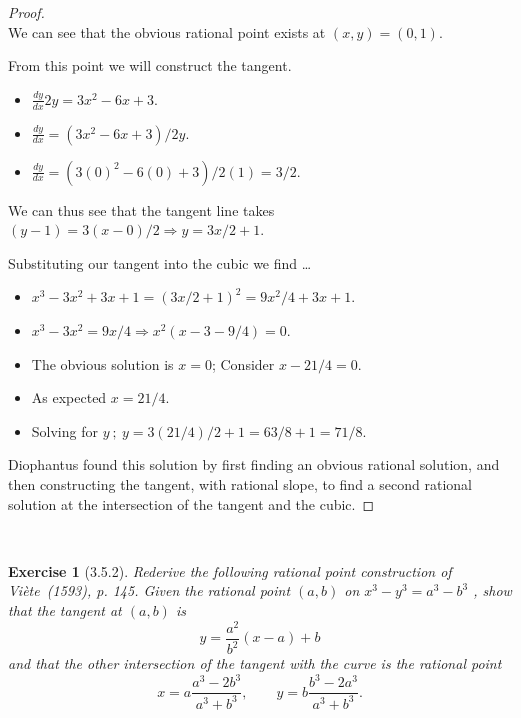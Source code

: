 \documentclass[12pt]{article}
\newcommand{\XB}{\color{black}}
\newcommand{\XBB}{\color{blue}}
\newcommand{\ds}{\displaystyle}
\theoremstyle{plain}
\newtheorem{ex}{Exercise}
\begin{document}
\begin{proof}
  \ \\

  We can see that the obvious rational point exists at $ (x, y) = (0, 1) $.

  From this point we will construct the tangent. 

  \begin{itemize}
    \item $ \ds \frac{dy}{dx} 2y = 3x^{2} - 6x + 3 $.
    \item $ \ds \frac{dy}{dx} = (3x^{2} - 6x + 3) / 2y $.
    \item $ \ds \frac{dy}{dx} = (3(0)^{2} - 6(0) + 3) / 2(1) = 3 / 2 $.
  \end{itemize}

  We can thus see that the tangent line takes $ (y - 1) = 3(x - 0) / 2 \Rightarrow y = 3x/2 + 1 $. 

  Substituting our tangent into the cubic we find \dots

  \begin{itemize}
    \item $ \ds x^{3} - 3x^{2} + 3x + 1 = (3x/2 + 1)^{2} = 9x^{2}/4 + 3x + 1 $.
    \item $ \ds x^{3} - 3x^{2} = 9x/4 \Rightarrow x^{2}(x - 3 - 9/4) = 0 $.
    \item The obvious solution is $ x = 0 $; Consider $ x - 21/4 = 0 $.
    \item As expected $ x = 21/4 $. 
    \item Solving for $ y \ ; \ y = 3(21/4)/2 + 1 = 63/8 + 1 = 71/8 $.
  \end{itemize} 

  Diophantus found this solution by first finding an obvious rational solution, and then constructing the tangent, with rational slope, 
  to find a second rational solution at the intersection of the tangent and the cubic. 

\end{proof}

\newpage

\XBB\hrulefill\XB \\
\begin{ex} [3.5.2]
  Rederive the following rational point construction of Vi\`{e}te~(1593), p. 145. Given the rational point $ (a, b) $ on $ x^{3} - y^{3} = a^{3} - b^{3} $ , show that the tangent at $(a,b)$ is
  \[
    y = \frac{a^{2}}{b^{2}}(x - a) + b
  \]
  \centering and that the other intersection of the tangent with the curve is the rational point
  \[
    x = a\frac{a^{3} - 2b^{3}}{a^{3} + b^{3}}, \qquad y = b\frac{b^{3} - 2a^{3}}{a^{3} + b^{3}}.
  \]
\end{ex}
\XBB\hrulefill\XB \\
\end{document}

